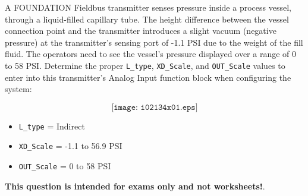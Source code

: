 

A FOUNDATION Fieldbus transmitter senses pressure inside a process vessel, through a liquid-filled capillary tube.  The height difference between the vessel connection point and the transmitter introduces a slight vacuum (negative pressure) at the transmitter's sensing port of -1.1 PSI due to the weight of the fill fluid.  The operators need to see the vessel's pressure displayed over a range of 0 to 58 PSI.  Determine the proper {\tt L\_type}, {\tt XD\_Scale}, and {\tt OUT\_Scale} values to enter into this transmitter's Analog Input function block when configuring the system:

$$\texttt{[image: i02134x01.eps]}$$







\begin{itemize}
\item{} {\tt L\_type} = Indirect
\item{} {\tt XD\_Scale} = -1.1 to 56.9 PSI 
\item{} {\tt OUT\_Scale} = 0 to 58 PSI
\end{itemize}







{\bf This question is intended for exams only and not worksheets!}.



